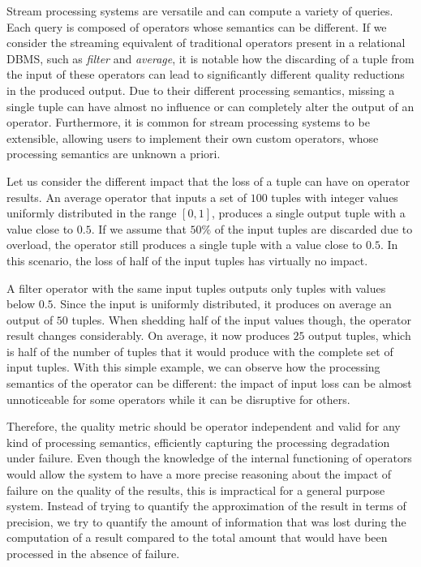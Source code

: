 Stream processing systems are versatile and can compute a variety of queries. Each query is composed of
operators whose semantics can be different. If we consider the streaming equivalent of traditional
operators present in a relational DBMS, such as \textit{filter} and \textit{average}, it is notable how
the discarding of a tuple from the input of these operators can lead to significantly different quality
reductions in the produced output. Due to their different processing semantics, missing a single tuple
can have almost no influence or can completely alter the output of an operator.
Furthermore, it is common for stream processing systems to be extensible, allowing users to implement
their own custom operators, whose processing semantics are unknown a priori.
	
Let us consider the different impact that the loss of a tuple can have on operator results.
An average operator that inputs a set of $100$ tuples with integer values uniformly distributed in the
range $[0,1]$, produces a single output tuple with a value close to $0.5$.
If we assume that $50\%$ of the input tuples are discarded due to overload, the operator still produces a
single tuple with a value close to $0.5$. In this scenario, the loss of half of the input tuples has
virtually no impact.

A filter operator with the same input tuples outputs only tuples with values below $0.5$. Since
the input is uniformly distributed, it produces on average an output of $50$ tuples.
When shedding half of the input values though, the operator result changes considerably. On average, it
now produces $25$ output tuples, which is half of the number of tuples that it would produce with the
complete set of input tuples. With this simple example, we can observe how the processing semantics of
the operator can be different: the impact of input loss can be almost unnoticeable for some operators
while it can be disruptive for others.
	
Therefore, the quality metric should be operator independent and valid for any kind of processing
semantics, efficiently capturing the processing degradation under failure. Even though the knowledge of
the internal functioning of operators would allow the system to have a more precise reasoning about the
impact of failure on the quality of the results, this is impractical for a general purpose system.
Instead of trying to quantify the approximation of the result in terms of  precision, we try to quantify
the amount of information that was lost during the computation of a result compared to the total amount
that would have been processed in the absence of failure.
	
